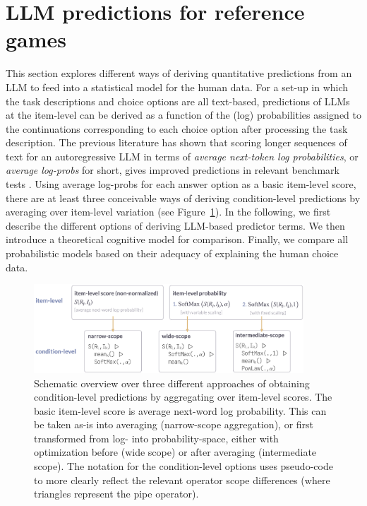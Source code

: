 \documentclass{article}
\begin{document}
\section{LLM predictions for reference games}
\label{llm-predictions-for-reference-games}

This section explores different ways of deriving quantitative predictions from an LLM to feed into a statistical model for the human data.
For a set-up in which the task descriptions and choice options are all text-based, predictions of LLMs at the item-level can be derived as a function of the (log) probabilities assigned to the continuations corresponding to each choice option after processing the task description.
The previous literature has shown that scoring longer sequences of text for an autoregressive LLM in terms of \emph{average next-token log probabilities}, or \emph{average log-probs} for short, gives improved predictions in relevant benchmark tests \citep[e.g.,][]{BrownMann2020:Language-Models}.
Using average log-probs for each answer option as a basic item-level score, there are at least three conceivable ways of deriving condition-level predictions by averaging over item-level variation (see Figure~\ref{fig:measures-overview}).
In the following, we first describe the different options of deriving LLM-based predictor terms.
We then introduce a theoretical cognitive model for comparison.
Finally, we compare all probabilistic models based on their adequacy of explaining the human choice data.

\begin{figure}
  \centering
  \includegraphics[width=0.9\textwidth]{00-pics/measures-overview.png}
  \caption{Schematic overview over three different approaches of obtaining condition-level predictions by aggregating over item-level scores. The basic item-level score is average next-word log probability. This can be taken as-is into averaging (narrow-scope aggregation), or first transformed from log- into probability-space, either with optimization before (wide scope) or after averaging (intermediate scope).
  The notation for the condition-level options uses pseudo-code to more clearly reflect the relevant operator scope differences (where triangles represent the pipe operator).}
  \label{fig:measures-overview}
\end{figure}
\end{document}
